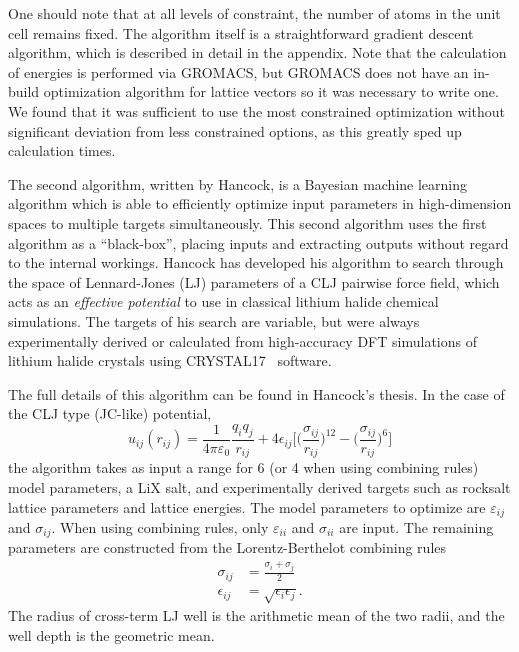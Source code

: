 \documentclass[aip,preprint,amsmath,amssymb,hidelinks]{revtex4-1}
\begin{document}
	
	One should note that at all levels of constraint, the number of atoms in the unit cell remains fixed. 
	The algorithm itself is a straightforward gradient descent algorithm, which is described in detail in the appendix.
	Note that the calculation of energies is performed via GROMACS, but GROMACS does not have an in-build optimization algorithm for lattice vectors so it was necessary to write one.
	We found that it was sufficient to use the most constrained optimization without significant deviation from less constrained options, as this greatly sped up calculation times.
	
	
	The second algorithm, written by Hancock, is a Bayesian machine learning algorithm which is able to efficiently optimize input parameters in high-dimension spaces to multiple targets simultaneously. This second algorithm uses the first algorithm as a ``black-box'', placing inputs and extracting outputs without regard to the internal workings. Hancock has developed his algorithm to search through the space of Lennard-Jones (LJ) parameters of a CLJ pairwise force field, which acts as an \textit{effective potential} to use in classical lithium halide chemical simulations. The targets of his search are variable, but were always experimentally derived or calculated from high-accuracy DFT simulations of lithium halide crystals using CRYSTAL17~\cite{Crystal17} software.
	
	
	The full details of this algorithm can be found in Hancock's thesis.
	In the case of the CLJ type (JC-like) potential, 
	\begin{equation}
	u_{ij} (r_{ij}) = \frac{1}{4 \pi \varepsilon_{0}}\frac{q_{i} q_{j} }{r_{ij}} + 4 \epsilon_{ij} \bigg[ \big(\frac{\sigma_{ij}}{r_{ij}} \big)^{12} - \big(\frac{\sigma_{ij}}{r_{ij}} \big)^{6} \bigg]
	\end{equation}
	the algorithm takes as input a range for 6 (or 4 when using combining rules) model parameters, a LiX salt, and experimentally derived targets such as rocksalt lattice parameters and lattice energies. The model parameters to optimize are $\varepsilon_{ij}$ and $\sigma_{ij}$. When using combining rules, only $\varepsilon_{ii}$ and $\sigma_{ii}$ are input. The remaining parameters are constructed from the Lorentz-Berthelot combining rules~\cite{lorentz1881ueber,berthelot1898melange}
	\begin{align}
	\sigma_{ij} &= \frac{\sigma_{i} + \sigma_{j}}{2}\\
	\epsilon_{ij} &= \sqrt{\epsilon_{i} \epsilon_{j}}.
	\end{align}
	The radius of cross-term LJ well is the arithmetic mean of the two radii, and the well depth is the geometric mean.
	
\end{document}
